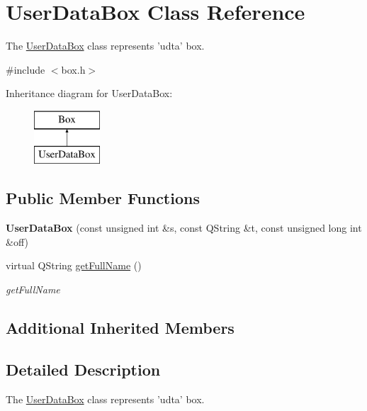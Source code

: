 \hypertarget{class_user_data_box}{\section{User\-Data\-Box Class Reference}
\label{class_user_data_box}
}


The \hyperlink{class_user_data_box}{User\-Data\-Box} class represents 'udta' box.  




{\ttfamily \#include $<$box.\-h$>$}

Inheritance diagram for User\-Data\-Box\-:\begin{figure}[H]
\begin{center}
\leavevmode
\includegraphics[height=2.000000cm]{class_user_data_box}
\end{center}
\end{figure}
\subsection*{Public Member Functions}
\begin{DoxyCompactItemize}
\item 
\hypertarget{class_user_data_box_a53de0a3e19a189cc879c16f48565888d}{{\bfseries User\-Data\-Box} (const unsigned int \&s, const Q\-String \&t, const unsigned long int \&off)}\label{class_user_data_box_a53de0a3e19a189cc879c16f48565888d}

\item 
virtual Q\-String \hyperlink{class_user_data_box_aa95cfad6fd0558e31894e76ed1bf8a20}{get\-Full\-Name} ()
\begin{DoxyCompactList}\small\item\em get\-Full\-Name \end{DoxyCompactList}\end{DoxyCompactItemize}
\subsection*{Additional Inherited Members}


\subsection{Detailed Description}
The \hyperlink{class_user_data_box}{User\-Data\-Box} class represents 'udta' box. 

